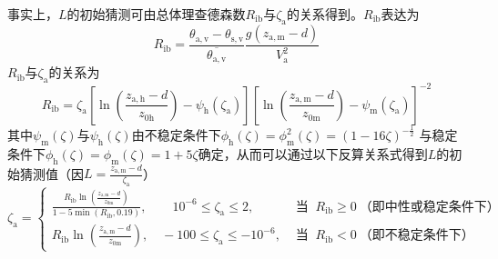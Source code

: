 事实上，$L$的初始猜测可由总体理查德森数$R_{\mathrm{ib}}$与$\zeta_{\mathrm{a}}$的关系得到\citep{arya2001introduction}。$R_{\mathrm{ib}}$表达为
\begin{equation}\label{Rib}
  R_{\mathrm{i b}}=\frac{\theta_{\mathrm{a,v}}-\theta_{\mathrm{s,v}}}{\overline{\theta_{\mathrm{a,v}}}} \frac{g\left(z_{\mathrm{a, m}}-d\right)}{V_{\mathrm{a}}^{2}}
\end{equation}
$R_{\mathrm{ib}}$与$\zeta_{\mathrm{a}}$的关系为
\begin{equation}
  R_{\mathrm{ib}}=\zeta_{\mathrm{a}}\left[\ln{\left(\frac{z_{\mathrm{a,h}}-d}{z_{\mathrm{0h}}}\right)-\psi_{\mathrm h}(\zeta_{\mathrm{a}})}\right] \left[\ln{\left(\frac{z_{\mathrm{a,m}}-d}{z_{\mathrm{0m}}}\right)-\psi_{\mathrm m}(\zeta_{\mathrm{a}})}\right]^{-2}
\end{equation}
其中$\psi_{\mathrm m}(\zeta)$与$\psi_{\mathrm h}(\zeta)$由不稳定条件下$\phi_{\mathrm h}\left(\zeta\right)=\phi_{\mathrm m}^2\left(\zeta\right)=\left(1-16\zeta\right)^{-\frac{1}{2}}$
与稳定条件下$\phi_{\mathrm h}\left(\zeta\right)=\phi_{\mathrm m}\left(\zeta\right)=1+5\zeta$确定，从而可以通过以下反算关系式得到$L$的初始猜测值（因$L=\frac{z_{\mathrm{a,m}}-d}{\zeta_{\mathrm{a}}}$）
\begin{equation}\label{ZetaRib}
  \zeta_{\mathrm{a}}=\begin{cases}
    \frac{R_{\mathrm{i b}} \ln \left(\frac{z_{\mathrm{a, m}}-d}{z_{\mathrm{0 m}}}\right)}{1-5 \min \left(R_{\mathrm{i b}}, 0.19\right)}, \qquad 10^{-6} \leqslant \zeta_{\mathrm{a}} \leqslant 2, & \text{ 当 }\ R_{\mathrm{i b}} \geqslant 0\ \text{（即中性或稳定条件下）} \\
    R_{\mathrm{ib}} \ln \left(\frac{z_{\mathrm{a, m}}-d}{z_{\mathrm{0 m}}}\right),  \quad -100 \leqslant \zeta_{\mathrm{a}} \leqslant-10^{-6}, & \text{ 当 }\ R_{\mathrm{i b}}<0\ \text{（即不稳定条件下）}
  \end{cases}
\end{equation}

